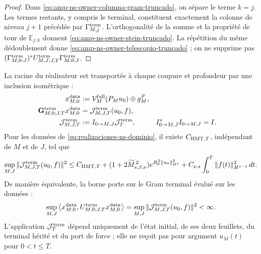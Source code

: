 \begin{proof}
Dans \eqref{eq:amp-ns-owner-columna-gram-truncado}, on sépare le terme \(k=j\). Les termes restants, y compris le terminal, constituent exactement la colonne de niveau \(j+1\) précédée par \(\Gamma_{M,j}^{\rm term}\). L'orthogonalité de la somme et la propriété de tour de \(\mathbb E_{j:k}\) donnent \eqref{eq:amp-ns-owner-stein-truncado}. La répétition du même dédoublement donne \eqref{eq:amp-ns-owner-telescopio-truncado} ; on ne supprime pas \((\Gamma_{M,0:J}^{\rm term})^*U_{M,J;J,T}^{\rm term}
\Gamma_{M,0:J}^{\rm term}\).
\end{proof}

\begin{theorem}
\label{thm:amp-ns-inyeccion-raiz-uniforme}
La racine du réalisateur est transportée à chaque coupure et profondeur par une inclusion isométrique :
\begin{equation}\label{eq:amp-ns-inyeccion-raiz-comun}
 \begin{aligned}
 x_{M,0}^{\rm data}
 &:=\mathcal V_M^{\rm full}(P_Mu_0)\oplus g_M^F,\\
 \mathbf G_{M,0;J,T}^{\rm term}x_{M,0}^{\rm data}
 &=\mathcal J_{M,J,T}^{\rm term}(u_0,f),\\
 \mathcal J_{M,J,T}^{\rm term}
 &:=I_{0\to M,J}\mathcal J_T^{\rm term},
 & I_{0\to M,J}^*I_{0\to M,J}&=I.
 \end{aligned}
\end{equation}
Pour les données de \eqref{eq:realizaciones-ns-dominio}, il existe \(C_{{\rm HMT},T}\), indépendant de \(M\) et de \(J\), tel que
\begin{equation}\label{eq:amp-ns-inyeccion-raiz-cota}
 \sup_{M,J}
 \|\mathcal J_{M,J,T}^{\rm term}(u_0,f)\|^2
 \leq C_{{\rm HMT},T}
 +(1+2\widetilde M_{s,\beta,\nu}^{\,2})
  e^{R_{\rm F}^{\,2}\|u_0\|_{H^s}^2}
 +C_{\nu,s}\int_0^T\|f(t)\|_{H^{s-1}}^2\,dt .
\end{equation}
De manière équivalente, la borne porte sur le Gram terminal évalué sur les données :
\begin{equation}\label{eq:amp-ns-owner-gram-cota-uniforme}
 \sup_{M,J}
 \left\langle x_{M,0}^{\rm data},
 U_{M,0;J,T}^{\rm term}x_{M,0}^{\rm data}\right\rangle
 =
 \sup_{M,J}
 \|\mathcal J_{M,J,T}^{\rm term}(u_0,f)\|^2
 <\infty .
\end{equation}
L'application \(\mathcal J_T^{\rm term}\) dépend uniquement de l'état initial, de ses deux feuillets, du terminal hérité et du port de force ; elle ne reçoit pas pour argument \(u_M(t)\) pour \(0<t\leq T\).
\end{theorem}

